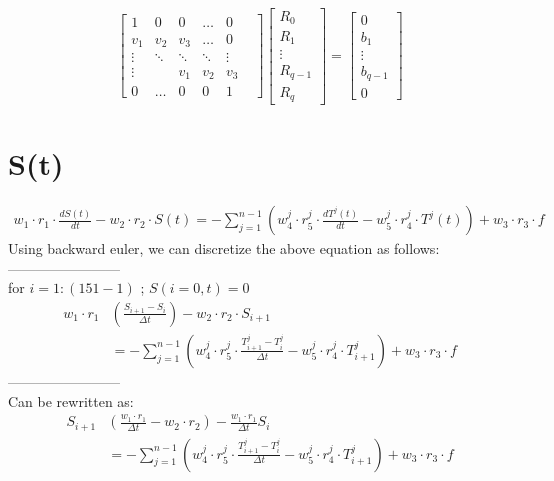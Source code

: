 \documentclass{article}
\def\ds{\displaystyle}
\begin{document}
\begin{equation}
\begin{bmatrix}
1    & 0    &  0        & \dots & 0 \\
v_1    &  v_2    &  v_3    & \dots & 0 \\
\vdots&  \ddots& \ddots & \ddots & \vdots  \\
\vdots&  & v_1  & v_2   &  v_3 & \\
0        & \dots&      0       &  0     & 1 &
\end{bmatrix}
\begin{bmatrix}
R_0 \\ R_1 \\ \vdots \\R_{q-1} \\R_q
\end{bmatrix}
= \begin{bmatrix}
0 \\ b_1 \\ \vdots \\ b_{q-1} \\ 0
\end{bmatrix}
\end{equation}

\newpage
\section*{S(t)}
\begin{align}
w_1 \cdot r_1 \cdot \frac{dS(t)}{dt} - w_2 \cdot r_2 \cdot S(t) = -\ds\sum_{j=1}^{n-1} \left( w_4^j \cdot r_5^j \cdot \frac{dT^j(t)}{dt} - w_5^j \cdot r_4^j \cdot T^j(t) \right) + w_3 \cdot r_3 \cdot f
\end{align}
Using backward euler, we can discretize the above equation as follows:  \\
------------------------\\
for $i=1:(151-1)$ ; $S(i=0,t) = 0$ 
\begin{align}
w_1 \cdot r_1 & \left( \frac{S_{i+1} - S_i}{\Delta t} \right) - w_2 \cdot r_2 \cdot S_{i+1} \nonumber \\
& = -\ds\sum_{j=1}^{n-1} \left( w_4^j \cdot r_5^j \cdot \frac{T^j_{i+1} - T^j_i}{\Delta t} - w_5^j \cdot r_4^j \cdot T^j_{i+1} \right) + w_3 \cdot r_3 \cdot f
\end{align}
------------------------\\
Can be rewritten as:
\begin{align}
S_{i+1} & \left( \frac{w_1 \cdot r_1}{\Delta t} - w_2 \cdot r_2 \right) - \frac{w_1 \cdot r_1}{\Delta t}S_i \nonumber \\ 
& = - \ds\sum_{j=1}^{n-1} \left( w_4^j \cdot r_5^j \cdot \frac{T^j_{i+1} - T^j_i}{\Delta t} - w_5^j \cdot r_4^j \cdot T^j_{i+1} \right) + w_3 \cdot r_3 \cdot f
\end{align}
\end{document}
